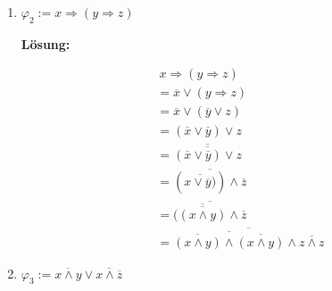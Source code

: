 \documentclass[paper=a4,fontsize=11pt]{scrartcl}%
\numberwithin{equation}{section}
\newenvironment{solution}
	{
		\color{Blue}
		\textbf{Lösung:}
	}{}
\begin{document}
\begin{enumerate}
\begin{enumerate}
\begin{solution}
		\begin{align*}
		&~ (x \Rightarrow y) \Rightarrow z\\
		&= \overline{x \Rightarrow y} \lor z\\
		&= \overline{\overline{x} \lor y} \lor z\\
		&= (x \land \overline{y}) \lor z\\
		&= (x \lor z) \land (\overline{y} \lor z)\\
		&= \overline{\overline{(x \lor z) \land (\overline{y} \lor z)}}\\
		&= \overline{\overline{(x \lor z)} \lor \overline{(\overline{y} \lor z)}} \\
		&= \overline{\overline{(x \lor z)} \lor \overline{(\overline{y \lor y} \lor z})}
		\end{align*}
		\end{solution}
		\item $\varphi_2 := x \Rightarrow (y \Rightarrow z)$
		
		\begin{solution}
		\begin{align*}
		&~ x \Rightarrow (y \Rightarrow z)\\
		&= \overline{x} \lor (y \Rightarrow z)\\
		&= \overline{x} \lor (\overline{y} \lor z)\\
		&= (\overline{x} \lor \overline{y}) \lor z\\
		&= \overline{\overline{(\overline{x} \lor \overline{y}) \lor z}}\\
		&= \overline{(\overline{x \lor \overline{y})})\land \overline{z}}\\
		&= \overline{(\overline{\overline{(x \land y)}}\land \overline{z}}\\
		&= \overline{\overline{\overline{(x \land y)} \land \overline{(x \land y)}} \land \overline{z \land z}}
		\end{align*}
		\end{solution}
		\item $\varphi_3 := \overline{x \land y} \lor \overline{x \land \overline{z}}$
		

\end{enumerate}
\end{enumerate}
\end{document}
